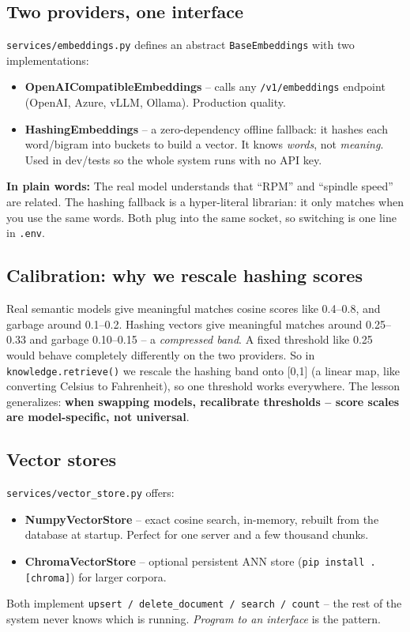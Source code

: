 \documentclass[11pt,a4paper]{article}
\newcommand{\layman}[1]{\par\medskip\noindent\textcolor{layman}{\textbf{In plain words:}} #1\par\smallskip}
\newcommand{\codefile}[1]{\texttt{\small #1}}
\begin{document}
\subsection{Two providers, one interface}
\codefile{services/embeddings.py} defines an abstract
\codefile{BaseEmbeddings} with two implementations:
\begin{itemize}[nosep]
  \item \textbf{OpenAICompatibleEmbeddings} -- calls any \codefile{/v1/embeddings}
        endpoint (OpenAI, Azure, vLLM, Ollama). Production quality.
  \item \textbf{HashingEmbeddings} -- a zero-dependency offline fallback: it hashes
        each word/bigram into buckets to build a vector. It knows \emph{words}, not
        \emph{meaning}. Used in dev/tests so the whole system runs with no API key.
\end{itemize}

\layman{The real model understands that ``RPM'' and ``spindle speed'' are related.
The hashing fallback is a hyper-literal librarian: it only matches when you use the
same words. Both plug into the same socket, so switching is one line in \codefile{.env}.}

\subsection{Calibration: why we rescale hashing scores}
Real semantic models give meaningful matches cosine scores like 0.4--0.8, and garbage
around 0.1--0.2. Hashing vectors give meaningful matches around 0.25--0.33 and garbage
0.10--0.15 -- a \emph{compressed band}. A fixed threshold like 0.25 would behave
completely differently on the two providers. So in \codefile{knowledge.retrieve()} we
rescale the hashing band onto [0,1] (a linear map, like converting Celsius to
Fahrenheit), so one threshold works everywhere. The lesson generalizes: \textbf{when
swapping models, recalibrate thresholds -- score scales are model-specific, not
universal}.

\subsection{Vector stores}
\codefile{services/vector\_store.py} offers:
\begin{itemize}[nosep]
  \item \textbf{NumpyVectorStore} -- exact cosine search, in-memory, rebuilt from the
        database at startup. Perfect for one server and a few thousand chunks.
  \item \textbf{ChromaVectorStore} -- optional persistent ANN store
        (\codefile{pip install .[chroma]}) for larger corpora.
\end{itemize}
Both implement \codefile{upsert / delete\_document / search / count} -- the rest of the
system never knows which is running. \emph{Program to an interface} is the pattern.
\end{document}
